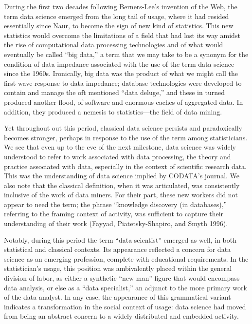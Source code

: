 \documentclass[
  letterpaper,
]{report}
\begin{document}
During the first two decades following Berners-Lee's invention of the
Web, the term data science emerged from the long tail of usage, where it
had resided essentially since Naur, to become the sign of new kind of
statistics. This new statistics would overcome the limitations of a
field that had lost its way amidst the rise of computational data
processing technologies and of what would eventually be called ``big
data,'' a term that we may take to be a synonym for the condition of
data impedance associated with the use of the term data science since
the 1960s. Ironically, big data was the product of what we might call
the first wave response to data impedance; database technologies were
developed to contain and manage the oft mentioned ``data deluge,'' and
these in turned produced another flood, of software and enormous caches
of aggregated data. In addition, they produced a nemesis to
statistics---the field of data mining.

Yet throughout out this period, classical data science persists and
paradoxically becomes stronger, perhaps in response to the use of the
term among statisticians. We see that even up to the eve of the next
milestone, data science was widely understood to refer to work
associated with data processing, the theory and practice associated with
data, especially in the context of scientific research data. This was
the understanding of data science implied by CODATA's journal. We also
note that the classical definition, when it was articulated, was
consistently inclusive of the work of data miners. For their part, these
new workers did not appear to need the term; the phrase ``knowledge
discovery (in databases),'' referring to the framing context of
activity, was sufficient to capture their understanding of their work
(Fayyad, Piatetsky-Shapiro, and Smyth 1996).

Notably, during this period the term ``data scientist'' emerged as well,
in both statistical and classical contexts. Its appearance reflected a
concern for data science as an emerging profession, complete with
educational requirements. In the statistician's usage, this position was
ambivalently placed within the general division of labor, as either a
synthetic ``new man'' figure that would encompass data analysis, or else
as a ``data specialist,'' an adjunct to the more primary work of the
data analyst. In any case, the appearance of this grammatical variant
indicates a transformation in the social context of usage: data science
had moved from being an abstract concern to a widely distributed and
embedded activity.
\end{document}
